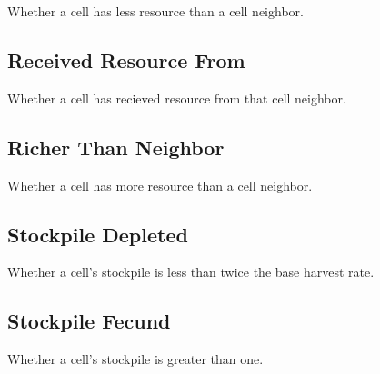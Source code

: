 Whether a cell has less resource than a cell neighbor.

\subsection{Received Resource From}

Whether a cell has recieved resource from that cell neighbor.

\subsection{Richer Than Neighbor}

Whether a cell has more resource than a cell neighbor.

\subsection{Stockpile Depleted}

Whether a cell's stockpile is less than twice the base harvest rate.

\subsection{Stockpile Fecund}

Whether a cell's stockpile is greater than one.
